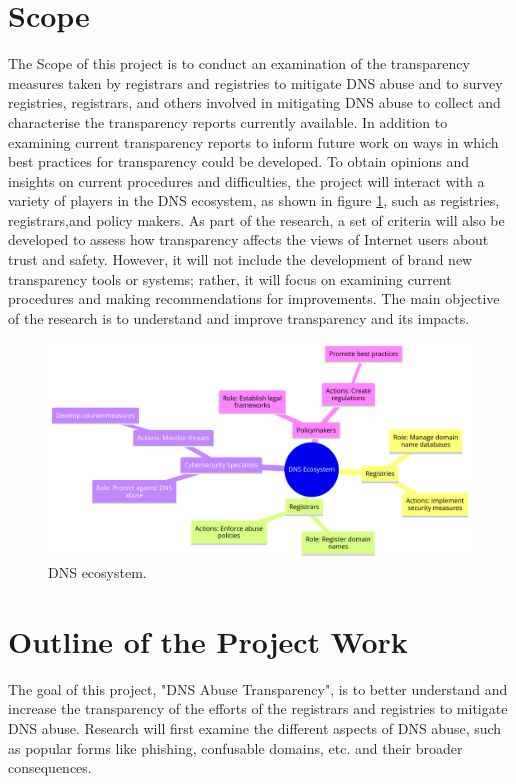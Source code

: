 \section{Scope}	
The Scope of this project is to conduct an examination of the transparency measures taken by registrars and registries to mitigate DNS abuse and to survey registries, registrars, and others involved in mitigating DNS abuse to collect and characterise the transparency reports currently available. In addition to examining current transparency reports to inform future work on ways in which best practices for transparency could be developed. To obtain opinions and insights on current procedures and difficulties, the project will interact with a variety of players in the DNS ecosystem, as shown in figure \ref{fig:dnsintrointro}, such as registries, registrars,and policy makers. As part of the research, a set of criteria will also be developed to assess how transparency affects the views of Internet users about trust and safety. However, it will not include the development of brand new transparency tools or systems; rather, it will focus on examining current procedures and making recommendations for improvements. The main objective of the research is to understand and improve transparency and its impacts. 

\begin{figure}[H]
    \centering
    \includegraphics[width=\linewidth]{introduction/diagram (8).png}
    \caption{ DNS ecosystem.}
    \label{fig:dnsintrointro}
\end{figure}

\section{ Outline of the Project Work} 
The goal of this project, "DNS Abuse Transparency", is to better understand and increase the transparency of the efforts of the registrars and registries to mitigate DNS abuse. Research will first examine the different aspects of DNS abuse, such as popular forms like phishing, confusable domains, etc. and their broader consequences. 

